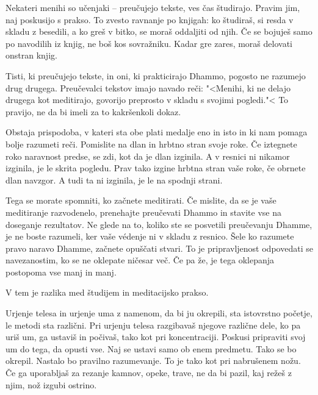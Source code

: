\vspace{-\baselineskip}

Nekateri menihi so učenjaki – preučujejo tekste, ves čas študirajo. Pravim jim, naj poskusijo s prakso. To zvesto ravnanje po knjigah: ko študiraš, si resda v skladu z besedili, a ko greš v bitko, se moraš oddaljiti od njih. Če se bojuješ samo po navodilih iz knjig, ne boš kos sovražniku. Kadar gre zares, moraš delovati onstran knjig.

\clearpage


Tisti, ki preučujejo tekste, in oni, ki prakticirajo Dhammo, pogosto ne razumejo drug drugega. Preučevalci tekstov imajo navado reči: "<Menihi, ki ne delajo drugega kot meditirajo, govorijo preprosto v skladu s svojimi pogledi."< To pravijo, ne da bi imeli za to kakršenkoli dokaz.

Obstaja prispodoba, v kateri sta obe plati medalje eno in isto in ki nam pomaga bolje razumeti reči. Pomislite na dlan in hrbtno stran svoje roke. Če iztegnete roko naravnost predse, se zdi, kot da je dlan izginila. A v resnici ni nikamor izginila, je le skrita pogledu. Prav tako izgine hrbtna stran vaše roke, če obrnete dlan navzgor. A tudi ta ni izginila, je le na spodnji strani.

Tega se morate spomniti, ko začnete meditirati. Če mislite, da se je vaše meditiranje razvodenelo, prenehajte preučevati Dhammo in stavite vse na doseganje rezultatov. Ne glede na to, koliko ste se posvetili preučevanju Dhamme, je ne boste razumeli, ker vaše védenje ni v skladu z resnico. Šele ko razumete pravo naravo Dhamme, začnete opuščati stvari. To je pripravljenost odpovedati se navezanostim, ko se ne oklepate ničesar več. Če pa že, je tega oklepanja postopoma vse manj in manj.

V tem je razlika med študijem in meditacijsko prakso.

\clearpage


Urjenje telesa in urjenje uma z namenom, da bi ju okrepili, sta istovrstno početje, le metodi sta različni. Pri urjenju telesa razgibavaš njegove različne dele, ko pa uriš um, ga ustaviš in počivaš, tako kot pri koncentraciji. Poskusi pripraviti svoj um do tega, da opusti vse. Naj se ustavi samo ob enem predmetu. Tako se bo okrepil. Nastalo bo pravilno razumevanje. To je tako kot pri nabrušenem nožu. Če ga uporabljaš za rezanje kamnov, opeke, trave, ne da bi pazil, kaj režeš z njim, nož izgubi ostrino.

